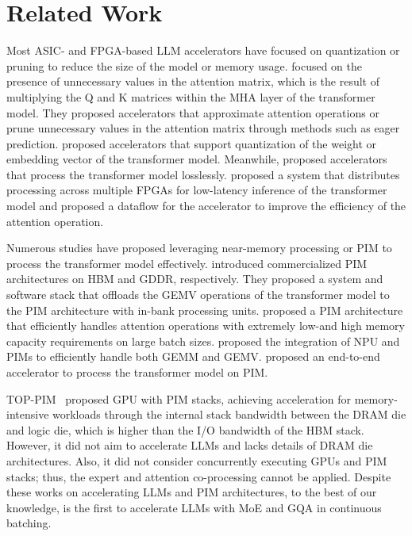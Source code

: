 \section{Related Work}
\label{sec:related_work}
Most ASIC- and FPGA-based LLM accelerators have focused on quantization or pruning to reduce the size of the model or memory usage.
\cite{hpca-2020-a3, isca-2021-elsa, hpca-2021-spatten, micro-2021-sanger, isca-2023-fact, asplos-2022-dota, isca-2022-mokey, isca-2022-leopard, micro-2022-butterfly, vlsi-2022-nmsparse} focused on the presence of unnecessary values in the attention matrix, which is the result of multiplying the Q and K matrices within the MHA layer of the transformer model. 
They proposed accelerators that approximate attention operations or prune unnecessary values in the attention matrix through methods such as eager prediction.
\cite{micro-2020-gobo, hpca-2021-spatten, isca-2023-olive} proposed accelerators that support quantization of the weight or embedding vector of the transformer model.
Meanwhile, \cite{micro-2022-dfx, asplos-2023-flat} proposed accelerators that process the transformer model losslessly.
\cite{micro-2022-dfx} proposed a system that distributes processing across multiple FPGAs for low-latency inference of the transformer model and \cite{asplos-2023-flat} proposed a dataflow for the accelerator to improve the efficiency of the attention operation.

Numerous studies have proposed leveraging near-memory processing or PIM to process the transformer model effectively.
\cite{isca-2021-hbm-pim, isscc-2022-aim} introduced commercialized PIM architectures on HBM and GDDR, respectively.
They proposed a system and software stack that offloads the GEMV operations of the transformer model to the PIM architecture with in-bank processing units.
\cite{asplos-2024-attacc} proposed a PIM architecture that efficiently handles attention operations with extremely low-\opb and high memory capacity requirements on large batch sizes.
\cite{asplos-2024-neupim} proposed the integration of NPU and PIMs to efficiently handle both GEMM and GEMV.
\cite{hpca-2022-transpim} proposed an end-to-end accelerator to process the transformer model on PIM.

TOP-PIM~\cite{hpdc-2014-toppim} proposed GPU with PIM stacks, achieving acceleration for memory-intensive workloads through the internal stack bandwidth between the DRAM die and logic die, which is higher than the I/O bandwidth of the HBM stack.
However, it did not aim to accelerate LLMs and lacks details of DRAM die architectures.
Also, it did not consider concurrently executing GPUs and PIM stacks; thus, the expert and attention co-processing cannot be applied.
%
Despite these works on accelerating LLMs and PIM architectures, to the best of our knowledge, \duplex is the first to accelerate LLMs with MoE and GQA in continuous batching.


\label{sec:related_work:accelerator}

